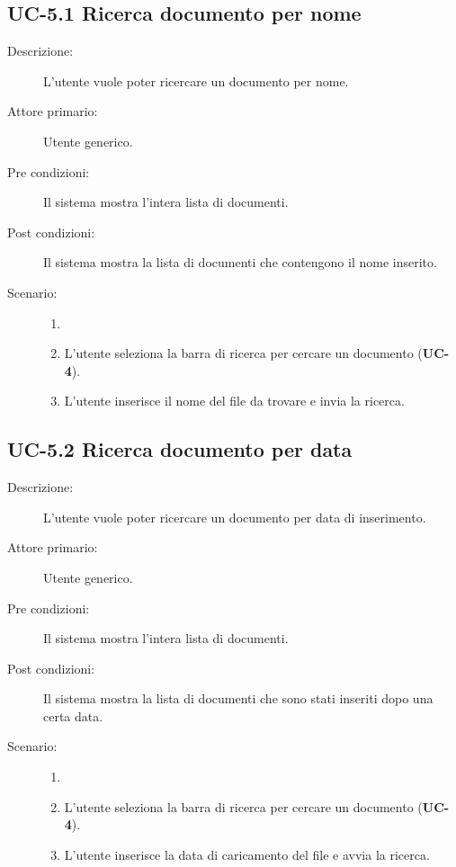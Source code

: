 \subsection{UC-5.1 Ricerca documento per nome}
\begin{description}
    \item[Descrizione:] L’utente vuole poter ricercare un documento per nome.
    \item[Attore primario:] Utente generico.
    \item[Pre condizioni:] Il sistema mostra l’intera lista di documenti.
    \item[Post condizioni:] Il sistema mostra la lista di documenti che contengono il nome inserito.
    \item[Scenario:] 
    \begin{enumerate}
        \item[]
        \item L’utente seleziona la barra di ricerca per cercare un documento (\textbf{UC-4}).
        \item L’utente inserisce il nome del file da trovare e invia la ricerca.
    \end{enumerate}
\end{description}

\subsection{UC-5.2 Ricerca documento per data}
\begin{description}
    \item[Descrizione:] L’utente vuole poter ricercare un documento per data di inserimento.
    \item[Attore primario:] Utente generico.
    \item[Pre condizioni:] Il sistema mostra l’intera lista di documenti.
    \item[Post condizioni:] Il sistema mostra la lista di documenti che sono stati inseriti dopo una certa data.
    \item[Scenario:] 
    \begin{enumerate}
        \item[]
        \item L’utente seleziona la barra di ricerca per cercare un documento (\textbf{UC-4}).
        \item L’utente inserisce la data di caricamento del file e avvia la ricerca.
    \end{enumerate}
\end{description}

